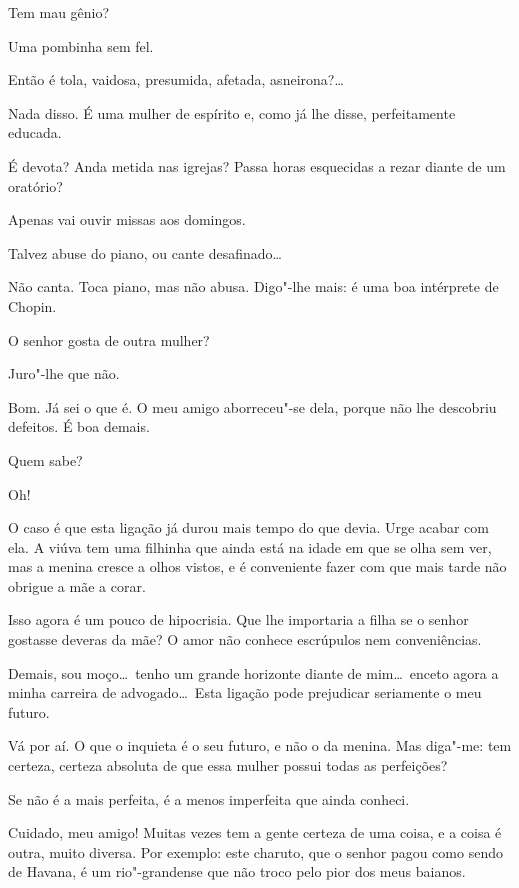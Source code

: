   Tem mau gênio?

  Uma pombinha sem fel.

  Então é tola, vaidosa, presumida, afetada,
asneirona?\ldots

   Nada
disso. É uma mulher de espírito e, como já lhe disse, perfeitamente
educada.

  É devota? Anda metida nas igrejas? Passa
horas esquecidas a rezar diante de um oratório?

  Apenas vai ouvir missas aos domingos.

  Talvez abuse do piano, ou cante
desafinado\ldots

  Não canta. Toca piano, mas não abusa.
Digo"-lhe mais: é uma boa intérprete de Chopin.

  O senhor gosta de outra mulher?

  Juro"-lhe que não.

  Bom. Já sei o que é. O meu amigo
aborreceu"-se dela, porque não lhe descobriu defeitos. É boa demais.

  Quem sabe?

  Oh!

  O caso é que esta ligação já durou mais tempo
do que devia. Urge acabar com ela. A viúva tem uma filhinha que ainda
está na idade em que se olha sem ver, mas a menina cresce a olhos
vistos, e é conveniente fazer com que mais tarde não obrigue a mãe a
corar.

  Isso agora é um pouco de hipocrisia. Que
lhe importaria a filha se o senhor gostasse deveras da mãe? O amor não
conhece escrúpulos nem conveniências.

  Demais, sou moço\ldots\ tenho um grande horizonte
diante de mim\ldots\ enceto agora a minha carreira de advogado\ldots\ Esta
ligação pode prejudicar seriamente o meu futuro.

  Vá por aí. O que o inquieta é o seu
futuro, e não o da menina. Mas diga"-me: tem certeza, certeza absoluta
de que essa mulher possui todas as perfeições?

  Se não é a mais perfeita, é a menos
imperfeita que ainda conheci.

  Cuidado, meu amigo! Muitas vezes tem a gente certeza de uma
coisa, e a coisa é outra, muito diversa. Por exemplo: este charuto, que
o senhor pagou como sendo de Havana, é um rio"-grandense que não troco
pelo pior dos meus baianos. 

